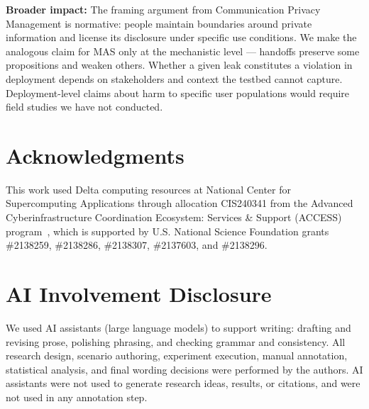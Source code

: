 \documentclass[11pt]{article}
\theoremstyle{plain}
\theoremstyle{definition}
\theoremstyle{remark}
\begin{document}
\noindent\textbf{Broader impact:} The framing argument from Communication Privacy Management is normative: people maintain boundaries around private information and license its disclosure under specific use conditions. We make the analogous claim for MAS only at the mechanistic level --- handoffs preserve some propositions and weaken others. Whether a given leak constitutes a violation in deployment depends on stakeholders and context the testbed cannot capture. Deployment-level claims about harm to specific user populations would require field studies we have not conducted.

\section*{Acknowledgments}
This work used Delta computing resources at National Center for Supercomputing Applications through allocation CIS240341 from the Advanced Cyberinfrastructure Coordination Ecosystem: Services \& Support (ACCESS) program~\cite{boerner2023access}, which is supported by U.S. National Science Foundation grants \#2138259, \#2138286, \#2138307, \#2137603, and \#2138296. 

\section*{AI Involvement Disclosure} 

We used AI assistants (large language models) to support writing: drafting and revising prose, polishing phrasing, and checking grammar and consistency. All research design, scenario authoring, experiment execution, manual annotation, statistical analysis, and final wording decisions were performed by the authors. AI assistants were not used to generate research ideas, results, or citations, and were not used in any annotation step.


% 
\appendix

\end{document}
